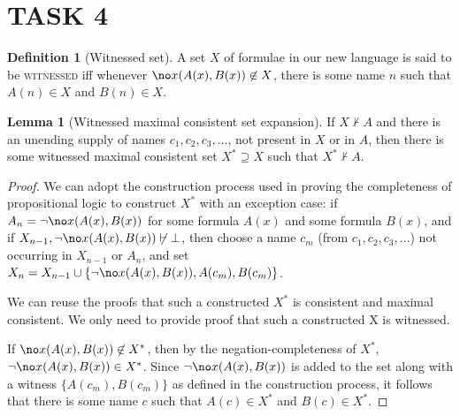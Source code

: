 \section*{TASK 4}
\theoremstyle{definition}
\newtheorem{definition}{Definition}
\newtheorem{lemma}{Lemma}

\begin{definition}[Witnessed set]
A set $X$ of formulae in our new language is said to be \textsc{witnessed} iff whenever $\no x (A(x), B(x)) \not\in X$, there is some name $n$ such that $A(n) \in X$ and $B(n) \in X$.
\end{definition}

\begin{lemma}[Witnessed maximal consistent set expansion]
If $X \not\vdash A$ and there is an unending supply of names $c_1,c_2,c_3,\dots$, not present in $X$ or in $A$, then there is some witnessed maximal consistent set $X^* \supseteq X$ such that $X^* \not\vdash A$.
\end{lemma}
\begin{proof}
We can adopt the construction process used in proving the completeness of propositional logic to construct $X^*$ with an exception case: if $A_n = \neg\no x (A(x), B(x))$ for some formula $A(x)$ and some formula $B(x)$, and if $X_{n-1}, \neg\no x (A(x), B(x)) \not\vdash \bot$, then choose a name $c_m$ (from $c_1,c_2,c_3,\dots$) not occurring in $X_{n-1}$ or $A_n$, and set $X_n = X_{n-1} \cup \{ \neg\no x (A(x), B(x)), A(c_m), B(c_m) \}$.

We can reuse the proofs that such a constructed $X^*$ is consistent and maximal consistent. We only need to provide proof that such a constructed X is witnessed.

If $\no x (A(x), B(x)) \not\in X^*$, then by the negation-completeness of $X^*$, $\neg\no x (A(x), B(x)) \in X^*$. Since $\neg\no x (A(x), B(x))$ is added to the set along with a witness $\{ A(c_m), B(c_m) \}$ as defined in the construction process, it follows that there is some name $c$ such that $A(c) \in X^*$ and $B(c) \in X^*$.
\end{proof}

